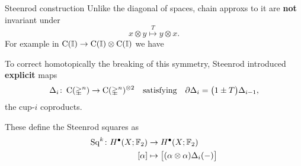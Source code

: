 
\begin{frame}{Steenrod construction}
	\pause
	Unlike the diagonal of spaces, chain approxs to it are \textbf{not} invariant under
	\[
	x \otimes y \stackrel{T}{\mapsto} y \otimes x.
	\]
	For example in $\operatorname{C}(\mathbb{I}) \to \operatorname{C}(\mathbb{I}) \otimes \operatorname{C}(\mathbb{I})$ we have
	\begin{center}
	\end{center}

	\smallskip\pause
	To correct homotopically the breaking of this symmetry, Steenrod introduced \textbf{explicit} maps
	\[
	\Delta_i \colon \operatorname{C}(\mathbb{\Delta}^n) \to \operatorname{C}(\mathbb{\Delta}^n)^{\otimes 2}
	\quad \text{satisfying} \quad
	\partial \Delta_{i} = \big(1 \pm T \big) \Delta_{i-1},
	\]
	the cup-$i$ coproducts.

	\smallskip\pause
	These define the Steenrod squares as
	\[
	\begin{split}
		\operatorname{Sq}^k \colon H^\bullet(X; {\mathbb{F}_2}) &\to H^\bullet(X; {\mathbb{F}_2}) \\
		[\alpha] &\mapsto \big[ (\alpha \otimes \alpha) \Delta_i(-) \big]
	\end{split}
	\]
\end{frame}

